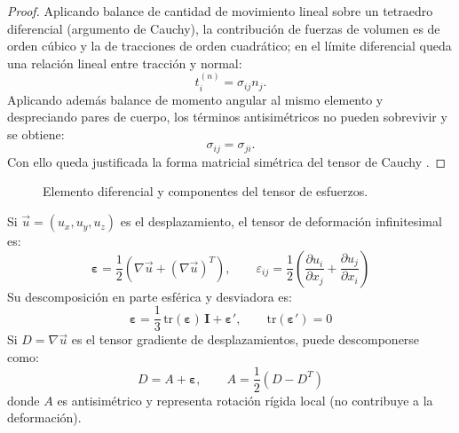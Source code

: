 \documentclass[12pt, a4paper]{article}
\theoremstyle{plain}
\theoremstyle{definition}
\theoremstyle{remark}
\newcommand{\ve}[1]{\vec{#1}}
\begin{document}
\begin{proof}
Aplicando balance de cantidad de movimiento lineal sobre un tetraedro diferencial (argumento
de Cauchy), la contribución de fuerzas de volumen es de orden cúbico y la de tracciones de
orden cuadrático; en el límite diferencial queda una relación lineal entre tracción y normal:
\begin{equation}
  t_i^{(n)}=\sigma_{ij}n_j.
\end{equation}
Aplicando además balance de momento angular al mismo elemento y despreciando pares de cuerpo,
los términos antisimétricos no pueden sobrevivir y se obtiene:
\begin{equation}
  \sigma_{ij}=\sigma_{ji}.
\end{equation}
Con ello queda justificada la forma matricial simétrica del tensor de Cauchy
\cite{mit12005_lec2}.
\end{proof}
\begin{figure}[H]
  \centering
  \caption{Elemento diferencial y componentes del tensor de esfuerzos.}
\end{figure}

Si $\ve{u}=(u_x,u_y,u_z)$ es el desplazamiento, el tensor de deformación infinitesimal es:
\begin{equation}
  \boldsymbol{\varepsilon}
  = \frac{1}{2}\left(\nabla \ve{u} + (\nabla \ve{u})^T\right),\qquad
  \varepsilon_{ij} = \frac{1}{2}\left(\frac{\partial u_i}{\partial x_j}
  + \frac{\partial u_j}{\partial x_i}\right)
\end{equation}
Su descomposición en parte esférica y desviadora es:
\begin{equation}
  \boldsymbol{\varepsilon}
  = \frac{1}{3}\,\mathrm{tr}(\boldsymbol{\varepsilon})\,\mathbf{I}
  + \boldsymbol{\varepsilon}',
  \qquad \mathrm{tr}(\boldsymbol{\varepsilon}')=0
\end{equation}
Si $D=\nabla\ve{u}$ es el tensor gradiente de desplazamientos, puede descomponerse como:
\begin{equation}
  D=A+\boldsymbol{\varepsilon},\qquad
  A=\frac{1}{2}(D-D^T)
\end{equation}
donde $A$ es antisimétrico y representa rotación rígida local (no contribuye a la deformación).
\end{document}
